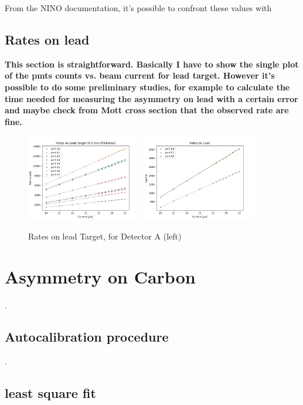 { 
From the NINO documentation, it's possible to confront these values with 

\newpage

\subsection{Rates on lead}

{\bfseries This section is straightforward. Basically I have to show the single plot of the pmts counts vs. beam current for lead target. However it's possible to do some preliminary studies, for example to calculate the time needed for measuring the asymmetry on lead with a certain error and maybe check from Mott cross section that the observed rate are fine.}

\begin{figure}[hbtp]
\centering
\includegraphics[width = 0.45\textwidth]{Analysis/Rates_on_lead.png}
\includegraphics[width = 0.45\textwidth]{Analysis/Rates_on_leadB.png}
\caption{Rates on lead Target, for Detector A (left)}
\end{figure}

\section{Asymmetry on Carbon}
.
\subsection{Autocalibration procedure}
.
\subsection{least square fit}

}
